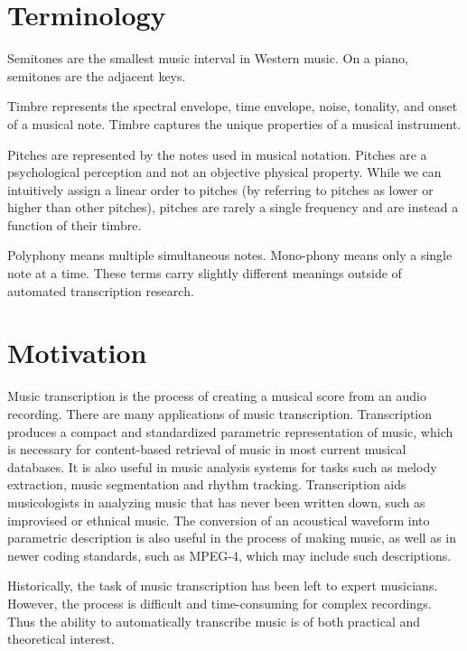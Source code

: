 \documentclass[5p]{elsarticle}
\begin{document}
\setcounter{topnumber}{1}

\section{Terminology}

Semitones are the smallest music interval in Western music. On a piano, semitones are the adjacent keys.

Timbre represents the spectral envelope, time envelope, noise, tonality, and onset of a musical note. Timbre captures the unique properties of a musical instrument.

Pitches are represented by the notes used in musical notation. Pitches are a psychological perception and not an objective physical property. While we can intuitively assign a linear order to pitches (by referring to pitches as lower or higher than other pitches), pitches are rarely a single frequency and are instead a function of their timbre.

Polyphony means multiple simultaneous notes. Mono-phony means only a single note at a time. These terms carry slightly different meanings outside of automated transcription research.

\section{Motivation}



Music transcription is the process of creating a musical score from an audio recording.  There are many applications of music transcription. Transcription produces a compact and standardized parametric representation of music, which is necessary for content-based retrieval of music in most current musical databases. It is also useful in music analysis systems for tasks such as melody extraction, music segmentation and rhythm tracking. Transcription aids musicologists in analyzing music that has never been written down, such as improvised or ethnical music. The conversion of an acoustical waveform into parametric description is also useful in the process of making music, as well as in newer coding standards, such as MPEG-4, which may include such descriptions.

Historically, the task of music transcription has been left to expert musicians.  However, the process is difficult and time-consuming for complex recordings.  Thus the ability to automatically transcribe music is of both practical and theoretical interest.
\end{document}
